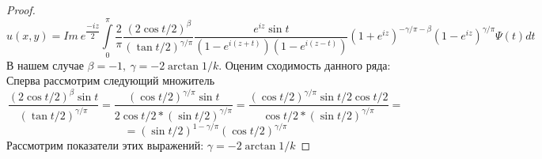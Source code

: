 \documentclass[12pt, a4paper]{extarticle}
\numberwithin{equation}{section}
\numberwithin{lemma}{section}
\numberwithin{definition}{section}
\numberwithin{notabene}{section}
\numberwithin{corollary}{section}
\begin{document}
\begin{proof}
\begin{equation*}
	\end{equation*}
	\begin{equation*}
		u(x,y) = Im\ e^{\dfrac{-iz}{2}} \int\limits_0^\pi   \dfrac{2}{\pi}\dfrac{(2\cos{t/2})^\beta}{(\tan{t/2})^{\gamma/\pi}}\dfrac{e^{iz} \sin{t}}{\left(1 - e^{i(z+t)} \right) \left(1 - e^{i(z-t)}\right)} (1 + e^{iz})^{-\gamma/\pi - \beta} (1- e^{iz})^{\gamma/\pi}  \Psi(t) dt
	\end{equation*}
		В нашем случае $\beta = -1, \ \gamma = -2 \arctan{1/k}$. Оценим сходимость данного ряда: \newline Сперва рассмотрим следующий множитель
	\begin{equation*}
		\dfrac{(2\cos{t/2})^\beta  \sin{t}}{(\tan{t/2})^{\gamma/\pi}} = \dfrac{(\cos{t/2})^{\gamma/\pi}\sin{t}}{ 2\cos{t/2} * (\sin{t/2})^{\gamma/\pi}}
		 = \dfrac{(\cos{t/2})^{\gamma/\pi}\sin{t/2} \cos{t/2}}{ \cos{t/2} * (\sin{t/2})^{\gamma/\pi}} = 
	\end{equation*}
\begin{equation*}
	= \left(\sin{t/2}\right) ^{1 - \gamma/\pi}  (\cos{t/2})^{\gamma/\pi}
\end{equation*}
	 Рассмотрим показатели этих выражений: $\gamma = -2\arctan{1/k}$
	\end{proof}
\end{document}
